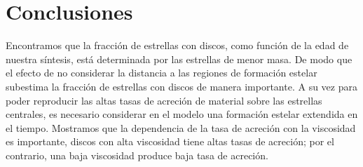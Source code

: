\documentclass[baaa]{baaa}
\begin{document}
\section{Conclusiones}
Encontramos que la fracción de estrellas con discos, como función de la edad de nuestra síntesis, está determinada por las estrellas de menor masa. De modo que el efecto de no considerar la distancia a las regiones de formación estelar subestima la fracción de estrellas con discos de manera importante. 
A su vez para poder reproducir las altas tasas de acreci\'on de material sobre las estrellas centrales, es necesario considerar en el modelo una  formación estelar extendida en el tiempo. 
Mostramos que la dependencia de la tasa de acreción con la viscosidad es importante, discos con alta viscosidad tiene altas tasas de acreci\'on; por el contrario, una baja viscosidad produce baja tasa de acreci\'on.


\small

 
\end{document}
